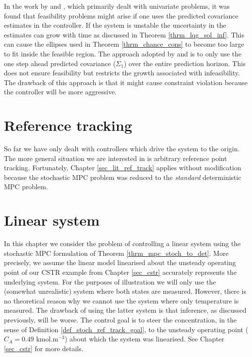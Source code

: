 In the work by \cite{yan1} and \cite{yan2}, which primarily dealt with univariate problems, it was found that feasibility problems might arise if one uses the predicted covariance estimates in the controller. If the system is unstable the uncertainty in the estimates can grow with time as discussed in Theorem \ref{thrm_lqg_sol_inf}. This can cause the ellipses used in Theorem \ref{thrm_chance_cons} to become too large to fit inside the feasible region. The approach adopted by \cite{yan1} and \cite{yan2} is to only use the one step ahead predicted covariance ($\Sigma_1$) over the entire prediction horizon. This does not ensure feasibility but restricts the growth associated with infeasibility. The drawback of this approach is that it might cause constraint violation because the controller will be more aggressive.  

\section{Reference tracking}
So far we have only dealt with controllers which drive the system to the origin. The more general situation we are interested in is arbitrary reference point tracking. Fortunately, Chapter \ref{sec_lit_ref_track} applies without modification because the stochastic MPC problem was reduced to the \textit{standard} deterministic MPC problem. 

\section{Linear system}
\label{sec_lin_sys_cont}
In this chapter we consider the problem of controlling a linear system using the stochastic MPC formulation of Theorem \ref{thrm_mpc_stoch_to_det}. More precisely, we assume the linear model linearised about the unsteady operating point of our CSTR example from Chapter \ref{sec_cstr} accurately represents the underlying system. For the purposes of illustration we will only use the (somewhat unrealistic) system where both states are measured. However, there is no theoretical reason why we cannot use the system where only temperature is measured. The drawback of using the latter system is that inference, as discussed previously, will be worse. The control goal is to steer the concentration, in the sense of Definition \ref{def_stoch_ref_track_goal}, to the unsteady operating point ($C_A = 0.49$ kmol.m$^{-3}$) about which the system was linearised. See Chapter \ref{sec_cstr} for more details.

